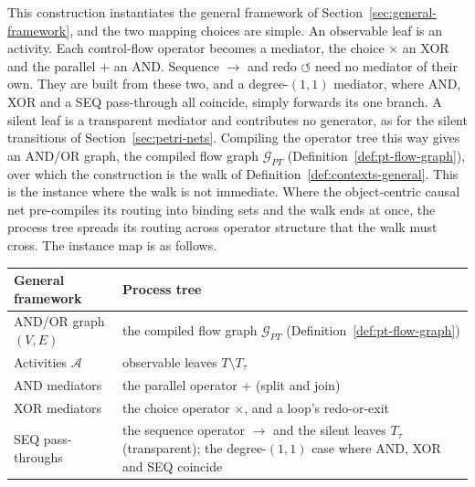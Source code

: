 This construction instantiates the general framework of Section~\ref{sec:general-framework}, and
the two mapping choices are simple. An observable leaf is an activity. Each control-flow operator
becomes a mediator, the choice $\times$ an XOR and the parallel $+$ an AND. Sequence $\to$ and redo
$\circlearrowleft$ need no mediator of their own. They are built from these two, and a
degree-$(1,1)$ mediator, where AND, XOR and a SEQ pass-through all coincide, simply forwards its one
branch. A silent leaf is a transparent mediator and contributes no generator, as for the silent
transitions of Section~\ref{sec:petri-nets}. Compiling the operator tree this way gives an AND/OR
graph, the compiled flow graph $\mathcal{G}_{PT}$ (Definition~\ref{def:pt-flow-graph}), over which
the construction is the walk of Definition~\ref{def:contexts-general}. This is the instance where
the walk is not immediate. Where the object-centric causal net pre-compiles its routing into binding
sets and the walk ends at once, the process tree spreads its routing across operator structure that
the walk must cross. The instance map is as follows.
\medskip
\begin{center}
  \small\begin{tabularx}{\linewidth}{@{}lX@{}}
    \hline
    General framework & Process tree \\
    \hline
    AND/OR graph $(V,E)$ & the compiled flow graph $\mathcal{G}_{PT}$ (Definition~\ref{def:pt-flow-graph}) \\
    Activities $\mathcal{A}$ & observable leaves $T\setminus T_\tau$ \\
    AND mediators & the parallel operator $+$ (split and join) \\
    XOR mediators & the choice operator $\times$, and a loop's redo-or-exit \\
    SEQ pass-throughs & the sequence operator $\to$ and the silent leaves $T_\tau$ (transparent); the degree-$(1,1)$ case where AND, XOR and SEQ coincide \\
    \hline
  \end{tabularx}
\end{center}
\medskip
